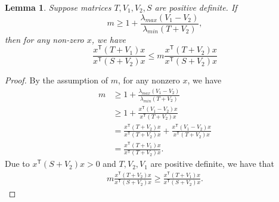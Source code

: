 \documentclass{article}
\newcommand{\transpose}{\mathsf{T}}
\newcommand{\quadinner}[1]{x^{\transpose}(#1)x}
\newtheorem{lemma}{Lemma}
\begin{document}
\begin{lemma}\label{lemma:m}
    Suppose matrices $T,V_{1},V_{2},S$ are positive definite. If
    \begin{equation}
        m \geq 1+\frac{\lambda_{max}(V_{1}-V_{2})}{\lambda_{min}(T+V_{2})},
    \end{equation}
    then for any non-zero $x$, we have
    \begin{equation}
        \frac{\quadinner{T+V_{1}}}{\quadinner{S+V_{2}}} \leq m\frac{\quadinner{T+V_{2}}}{\quadinner{S+V_{2}}}
    \end{equation}
\end{lemma}
\begin{proof}
    By the assumption of $m$, for any nonzero $x$, we have
    \begin{align*}
        m &\geq 1+\frac{\lambda_{max}(V_{1}-V_{2})}{\lambda_{min}(T+V_{2})}\\
        &\geq 1+ \frac{\quadinner{V_{1}-V_{2}}}{\quadinner{T+V_{2}}}\\
        &= \frac{\quadinner{T+V_{2}}}{\quadinner{T+V_{2}}} + \frac{\quadinner{V_{1}-V_{2}}}{\quadinner{T+V_{2}}}\\
        &= \frac{\quadinner{T+V_{1}}}{\quadinner{T+V_{2}}}.
     \end{align*}
     Due to $\quadinner{S+V_{2}} > 0$ and $T,V_{2},V_{1}$ are positive definite, we have that
     \begin{align*}
         m\frac{\quadinner{T+V_{2}}}{\quadinner{S+V_{2}}} \geq \frac{\quadinner{T+V_{1}}}{\quadinner{S+V_{2}}}.
     \end{align*}
\end{proof}
\end{document}
